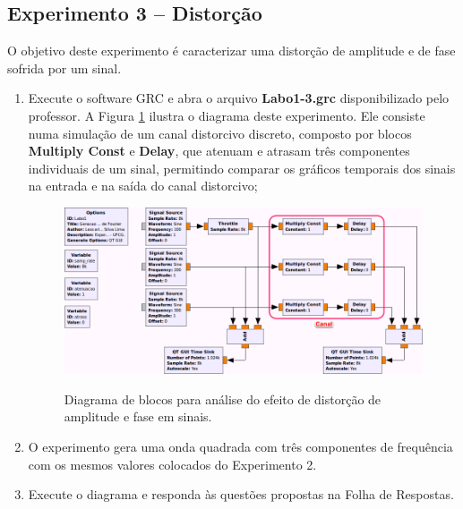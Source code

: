 \documentclass[12pt,addpoints]{exam}
\newcommand{\myscale}{0.4}
\begin{document}
\subsection{Experimento 3 -- Distorção}

O objetivo deste experimento é caracterizar uma distorção de amplitude e de fase sofrida por um sinal.

\begin{enumerate}
    \item Execute o software GRC e abra o arquivo \textbf{Labo1-3.grc} disponibilizado pelo professor. A Figura \ref{fig:GRC_1-3} ilustra o diagrama deste experimento. Ele consiste numa simulação de um canal distorcivo discreto, composto por blocos \textbf{Multiply Const} e \textbf{Delay}, que atenuam e atrasam três componentes individuais de um sinal, permitindo comparar os gráficos temporais dos sinais na entrada e na saída do canal distorcivo;
    \begin{figure}[htb]
        \centering
        \includegraphics[scale=\myscale]{./Figuras/GRC_1-3} \\
        \caption{Diagrama de blocos para análise do efeito de distorção de amplitude e fase em sinais.} 
        \label{fig:GRC_1-3}
    \end{figure}
  \item O experimento gera uma onda quadrada com três componentes de frequência com os mesmos valores colocados do Experimento 2.
    
    \item Execute o diagrama e responda às questões propostas na Folha de Respostas.
\end{enumerate}
\end{document}
